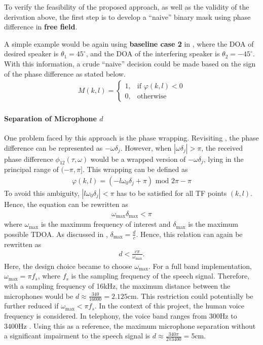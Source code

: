 \documentclass[a4paper,twoside,12pt,hidelinks]{article}
\begin{document}
To verify the feasibility of the proposed approach, as well as the validity of the derivation above, the first step is to develop a ``naive'' binary mask using phase difference in \textbf{free field}.

A simple example would be again using \textbf{baseline case 2} in , where the DOA of desired speaker is $\theta_1 = 45^\circ$, and the DOA of the interfering speaker is $\theta_2 = -45^\circ$. With this information, a crude ``naive'' decision could be made based on the sign of the phase difference as stated below.
\begin{align}
M(k,l) = \begin{cases} 1, & \text{if } \varphi(k,l)<0 \\ 0, & \text{otherwise} \end{cases} \label{eq:naivemask}
\end{align}
\paragraph{Separation of Microphone $d$}
One problem faced by this approach is the phase wrapping. Revisiting , the phase difference can be represented as $-\omega\delta_j$. However, when $|\omega\delta_j|>\pi$, the received phase difference $\phi_{12}(\tau,\omega)$ would be a wrapped version of $-\omega\delta_j$, lying in the principal range of $(-\pi,\pi]$. This wrapping can be defined as 
\begin{align}
\varphi(k,l)=(-l\omega_0\delta_j+\pi)\text{ mod }2\pi -\pi
\end{align}
To avoid this ambiguity, $|l\omega_0\delta_j|<\pi$ has to be satisfied for all TF points $(k,l)$. Hence, the equation can be rewritten as 
\begin{align}
\omega_\text{max}\delta_\text{max}<\pi
\end{align}
where $\omega_\text{max}$ is the maximum frequency of interest and $\delta_\text{max}$ is the maximum possible TDOA. As discussed in , $\delta_\text{max}=\frac{d}{c}$. Hence, this relation can again be rewritten as
\begin{align}
d < \frac{c\pi}{\omega_\text{max}}.
\end{align}
Here, the design choice became to choose $\omega_\text{max}$. For a full band implementation, $\omega_\text{max}=\pi f_s$, where $f_s$ is the sampling frequency of the speech signal. Therefore, with a sampling frequency of 16kHz, the maximum distance between the microphones would be $d\approx\frac{340}{16000}=2.125\text{cm}$. This restriction could potentially be further reduced if $\omega_\text{max}<\pi f_s$. In the context of this project, the human voice frequency is considered. In telephony, the voice band ranges from 300Hz to 3400Hz \cite{Freeman2005FundamentalsTelecommunications}. Using this as a reference, the maximum microphone separation without a significant impairment to the speech signal is $d\approx\frac{340\pi}{2\pi3400}=5\text{cm}$. 
\end{document}
